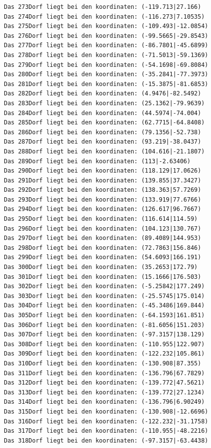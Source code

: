 \documentclass{article}
\begin{document}
\begin{verbatim}
Das 273Dorf liegt bei den koordinaten: (-119.713|27.166)
Das 274Dorf liegt bei den koordinaten: (-116.273|7.10535)
Das 275Dorf liegt bei den koordinaten: (-109.493|-12.0854)
Das 276Dorf liegt bei den koordinaten: (-99.5665|-29.8543)
Das 277Dorf liegt bei den koordinaten: (-86.7801|-45.6899)
Das 278Dorf liegt bei den koordinaten: (-71.5013|-59.1369)
Das 279Dorf liegt bei den koordinaten: (-54.1698|-69.8084)
Das 280Dorf liegt bei den koordinaten: (-35.2841|-77.3973)
Das 281Dorf liegt bei den koordinaten: (-15.3875|-81.6853)
Das 282Dorf liegt bei den koordinaten: (4.9476|-82.5492)
Das 283Dorf liegt bei den koordinaten: (25.1362|-79.9639)
Das 284Dorf liegt bei den koordinaten: (44.5974|-74.004)
Das 285Dorf liegt bei den koordinaten: (62.7715|-64.8408)
Das 286Dorf liegt bei den koordinaten: (79.1356|-52.738)
Das 287Dorf liegt bei den koordinaten: (93.219|-38.0437)
Das 288Dorf liegt bei den koordinaten: (104.616|-21.1807)
Das 289Dorf liegt bei den koordinaten: (113|-2.63406)
Das 290Dorf liegt bei den koordinaten: (118.129|17.0626)
Das 291Dorf liegt bei den koordinaten: (139.855|37.3427)
Das 292Dorf liegt bei den koordinaten: (138.363|57.7269)
Das 293Dorf liegt bei den koordinaten: (133.919|77.6766)
Das 294Dorf liegt bei den koordinaten: (126.617|96.7667)
Das 295Dorf liegt bei den koordinaten: (116.614|114.59)
Das 296Dorf liegt bei den koordinaten: (104.123|130.767)
Das 297Dorf liegt bei den koordinaten: (89.4089|144.953)
Das 298Dorf liegt bei den koordinaten: (72.7863|156.846)
Das 299Dorf liegt bei den koordinaten: (54.6093|166.191)
Das 300Dorf liegt bei den koordinaten: (35.2653|172.79)
Das 301Dorf liegt bei den koordinaten: (15.1666|176.503)
Das 302Dorf liegt bei den koordinaten: (-5.25842|177.249)
Das 303Dorf liegt bei den koordinaten: (-25.5745|175.014)
Das 304Dorf liegt bei den koordinaten: (-45.3486|169.844)
Das 305Dorf liegt bei den koordinaten: (-64.1593|161.851)
Das 306Dorf liegt bei den koordinaten: (-81.6056|151.203)
Das 307Dorf liegt bei den koordinaten: (-97.3157|138.129)
Das 308Dorf liegt bei den koordinaten: (-110.955|122.907)
Das 309Dorf liegt bei den koordinaten: (-122.232|105.861)
Das 310Dorf liegt bei den koordinaten: (-130.908|87.355)
Das 311Dorf liegt bei den koordinaten: (-136.796|67.7829)
Das 312Dorf liegt bei den koordinaten: (-139.772|47.5621)
Das 313Dorf liegt bei den koordinaten: (-139.772|27.1234)
Das 314Dorf liegt bei den koordinaten: (-136.796|6.90249)
Das 315Dorf liegt bei den koordinaten: (-130.908|-12.6696)
Das 316Dorf liegt bei den koordinaten: (-122.232|-31.1758)
Das 317Dorf liegt bei den koordinaten: (-110.955|-48.2216)
Das 318Dorf liegt bei den koordinaten: (-97.3157|-63.4438)

\end{verbatim}
\end{document}
